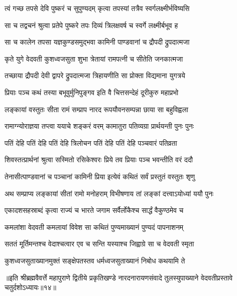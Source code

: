 \twolineshloka
{त्वं गच्छ तपसे देवि पुष्करं च सुपुण्यदम्}
{कृत्वा तपस्यां तत्रैव स्वर्गलक्ष्मीर्भविष्यसि}%

\twolineshloka
{सा च तद्वचनं श्रुत्वा प्रतेपे पुष्करे तपः}
{दिव्यं त्रिलक्षवर्ष च स्वर्गे लक्ष्मीर्बभूव ह}%

\twolineshloka
{सा च कालेन तपसा यज्ञकुण्डसमुद्भवा}
{कामिनी पाण्डवानां च द्रौपदी द्रुपदात्मजा}%

\twolineshloka
{कृते युगे वेदवती कुशध्वजसुता शुभा}
{त्रेतायां रामपत्नी च सीतेति जनकात्मजा}%

\twolineshloka
{तच्छाया द्रौपदी देवी द्वापरे द्रुपदात्मजा}
{त्रिहायणीति सा प्रोक्ता विद्यमाना युगत्रये}%


\twolineshloka
{प्रियाः पञ्च कथं तस्या बभूवुर्मुनिपुङ्गव}
{इति वै चित्तसन्देहं दूरीकुरु महाप्रभो}%


\twolineshloka
{लङ्कायां वस्तुतः सीता रामं सम्प्राप नारद}
{रूपयौवनसम्पन्ना छाया सा बहुविह्वला}%

\twolineshloka
{रामाग्न्योराज्ञया तप्त्वा ययाचे शङ्करं वरम्}
{कामातुरा पतिव्यग्रा प्रार्थयन्ती पुनः पुनः}%

\twolineshloka
{पतिं देहि पतिं देहि पतिं देहि त्रिलोचन}
{पतिं देहि पतिं देहि पञ्चवारं पतिव्रता}%

\twolineshloka
{शिवस्तत्प्रार्थनां श्रुत्वा सस्मितो रसिकेश्वरः}
{प्रिये तव प्रियाः पञ्च भवन्तीति वरं ददौ}%

\twolineshloka
{तेनासीत्पाण्डवानां च पञ्चानां कामिनी प्रिया}
{इत्येवं कथितं सर्वं प्रस्तुतं वस्तुतः शृणु}%

\twolineshloka
{अथ सम्प्राप्य लङ्कायां सीतां रामो मनोहराम्}
{विभीषणाय तां लङ्कां दत्त्वाऽयोध्यां ययौ पुनः}%

\twolineshloka
{एकादशसहस्राब्दं कृत्वा राज्यं च भारते}
{जगाम सर्वैर्लोकैश्च सार्द्धं वैकुण्ठमेव च}%

\twolineshloka
{कमलांशा वेदवती कमलायां विवेश सा}
{कथितं पुण्यमाख्यानं पुण्यदं पापनाशनम्}%

\twolineshloka
{सततं मूर्तिमन्तश्च वेदाश्चत्वार एव च}
{सन्ति यस्याश्च जिह्वाग्रे सा च वेदवती स्मृता}%

\twolineshloka
{कुशध्वजसुताख्यानमुक्तं सङ्क्षेपतस्तव}
{धर्मध्वजसुताख्यानं निबोध कथयामि ते}%

॥इति श्रीब्रह्मवैवर्त्ते महापुराणे द्वितीये प्रकृतिखण्डे नारदनारायणसंवादे तुलस्युपाख्याने वेदवतीप्रस्तावे चतुर्दशोऽध्यायः॥१४॥
